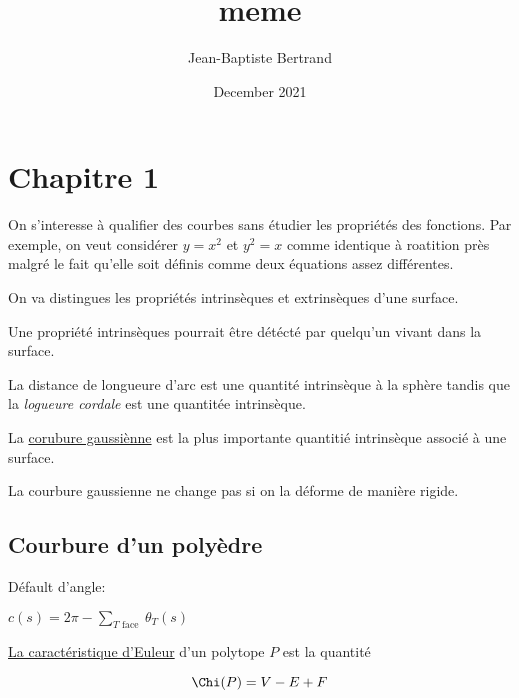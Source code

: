 \documentclass{article}
\title{meme}
\author{Jean-Baptiste Bertrand}
\date{December 2021}
\begin{document}
\section{Chapitre 1}

On s'interesse à qualifier des courbes sans étudier les propriétés des fonctions. Par exemple, on veut considérer $y=x^2$ et $y^2=x$ comme identique à roatition près malgré le fait qu'elle soit définis comme deux équations assez différentes.

On va distingues les propriétés intrinsèques et extrinsèques d'une surface.

Une propriété intrinsèques pourrait être détécté par quelqu'un vivant dans la surface.

La distance de longueure d'arc est une quantité intrinsèque à la sphère tandis que la \textit{logueure cordale} est une quantitée intrinsèque.

La \underline{corubure gaussiènne} est la plus importante quantitié intrinsèque associé à une surface.

La courbure gaussienne ne change pas si on la déforme de manière rigide.

\subsection{Courbure d'un polyèdre}

Défault d'angle:

$c(s)=2 \pi-\sum_{T \text { face }} \theta_{T}(s)$


\underline{La caractéristique d'Euleur} d'un polytope $P$ est la quantité

$$\Chi(P) = V - E + F$$
\end{document}
